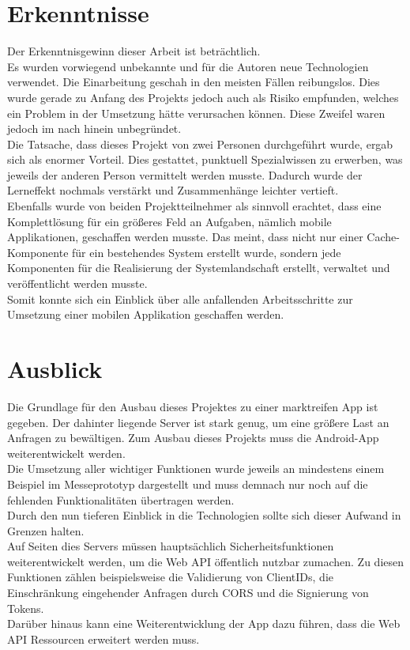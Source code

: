 \section{Erkenntnisse}
\label{sec:erkenntnisse}
Der Erkenntnisgewinn dieser Arbeit ist beträchtlich. \\
Es wurden vorwiegend unbekannte und für die Autoren neue Technologien verwendet. Die Einarbeitung geschah in den meisten Fällen reibungslos. Dies wurde gerade zu Anfang des Projekts jedoch auch als Risiko empfunden, welches ein Problem in der Umsetzung hätte verursachen können. Diese Zweifel waren jedoch im nach hinein unbegründet. \\
Die Tatsache, dass dieses Projekt von zwei Personen durchgeführt wurde, ergab sich als enormer Vorteil. Dies gestattet, punktuell Spezialwissen zu erwerben, was jeweils der anderen Person vermittelt werden musste. Dadurch wurde der Lerneffekt nochmals verstärkt und Zusammenhänge leichter vertieft.\\
Ebenfalls wurde von beiden Projektteilnehmer als sinnvoll erachtet, dass eine Komplettlösung für ein größeres Feld an Aufgaben, nämlich mobile Applikationen, geschaffen werden musste. Das meint, dass nicht nur einer Cache-Komponente für ein bestehendes System erstellt wurde, sondern jede Komponenten für die Realisierung der Systemlandschaft erstellt, verwaltet und veröffentlicht werden musste.\\
Somit konnte sich ein Einblick über alle anfallenden Arbeitsschritte zur Umsetzung einer mobilen Applikation geschaffen werden. 
\section{Ausblick}
\label{sec:ausblick}
Die Grundlage für den Ausbau dieses Projektes zu einer marktreifen \gls{App} ist gegeben. Der dahinter liegende Server ist stark genug, um eine größere Last an Anfragen zu bewältigen. Zum Ausbau dieses Projekts muss die \gls{Android}-\gls{App} weiterentwickelt werden. \\
Die Umsetzung aller wichtiger Funktionen wurde jeweils an mindestens einem Beispiel im Messeprototyp dargestellt und muss demnach nur noch auf die fehlenden Funktionalitäten übertragen werden.\\
Durch den nun tieferen Einblick in die Technologien sollte sich dieser Aufwand in Grenzen halten.\\
Auf Seiten dies Servers müssen hauptsächlich Sicherheitsfunktionen weiterentwickelt werden, um die Web API öffentlich nutzbar zumachen. Zu diesen Funktionen zählen beispielsweise die Validierung von ClientIDs, die Einschränkung eingehender Anfragen durch \ac{CORS} und die Signierung von Tokens. \\
Darüber hinaus kann eine Weiterentwicklung der \ac{App} dazu führen, dass die Web \ac{API} Ressourcen erweitert werden muss. 